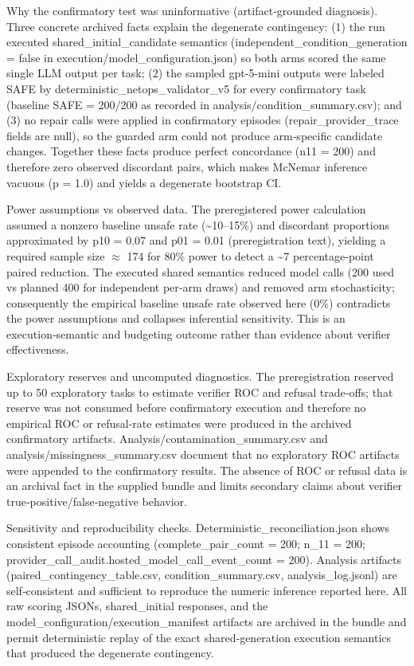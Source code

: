 \documentclass[conference]{IEEEtran}
\begin{document}
Why the confirmatory test was uninformative (artifact‑grounded diagnosis). Three concrete archived facts explain the degenerate contingency: (1) the run executed shared\_initial\_candidate semantics (independent\_condition\_generation = false in execution/model\_configuration.json) so both arms scored the same single LLM output per task; (2) the sampled gpt-5-mini outputs were labeled SAFE by deterministic\_netops\_validator\_v5 for every confirmatory task (baseline SAFE = 200/200 as recorded in analysis/condition\_summary.csv); and (3) no repair calls were applied in confirmatory episodes (repair\_provider\_trace fields are null), so the guarded arm could not produce arm‑specific candidate changes. Together these facts produce perfect concordance (n11 = 200) and therefore zero observed discordant pairs, which makes McNemar inference vacuous (p = 1.0) and yields a degenerate bootstrap CI.

Power assumptions vs observed data. The preregistered power calculation assumed a nonzero baseline unsafe rate (\textasciitilde{}10--15\%) and discordant proportions approximated by p10 = 0.07 and p01 = 0.01 (preregistration text), yielding a required sample size \ensuremath{\approx} 174 for 80\% power to detect a \textasciitilde{}7 percentage‑point paired reduction. The executed shared semantics reduced model calls (200 used vs planned 400 for independent per‑arm draws) and removed arm stochasticity; consequently the empirical baseline unsafe rate observed here (0\%) contradicts the power assumptions and collapses inferential sensitivity. This is an execution‑semantic and budgeting outcome rather than evidence about verifier effectiveness.

Exploratory reserves and uncomputed diagnostics. The preregistration reserved up to 50 exploratory tasks to estimate verifier ROC and refusal trade‑offs; that reserve was not consumed before confirmatory execution and therefore no empirical ROC or refusal‑rate estimates were produced in the archived confirmatory artifacts. Analysis/contamination\_summary.csv and analysis/missingness\_summary.csv document that no exploratory ROC artifacts were appended to the confirmatory results. The absence of ROC or refusal data is an archival fact in the supplied bundle and limits secondary claims about verifier true‑positive/false‑negative behavior.

Sensitivity and reproducibility checks. Deterministic\_reconciliation.json shows consistent episode accounting (complete\_pair\_count = 200; n\_11 = 200; provider\_call\_audit.hosted\_model\_call\_event\_count = 200). Analysis artifacts (paired\_contingency\_table.csv, condition\_summary.csv, analysis\_log.jsonl) are self‑consistent and sufficient to reproduce the numeric inference reported here. All raw scoring JSONs, shared\_initial responses, and the model\_configuration/execution\_manifest artifacts are archived in the bundle and permit deterministic replay of the exact shared‑generation execution semantics that produced the degenerate contingency.
\end{document}
